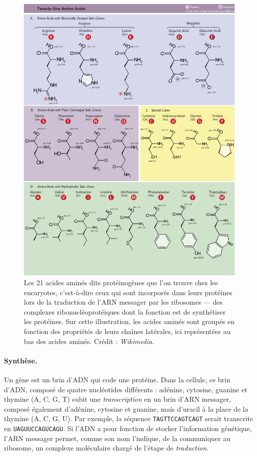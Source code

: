 	\begin{figure}[htb]
		\centering
		\includegraphics[width=\textwidth]{figures/ch1/aminoAcids}
		\caption[Ensemble des acides aminés]{Les 21 acides aminés dits protéinogènes que l'on trouve chez les eucaryotes, c'est-à-dire ceux qui sont incorporés dans leurs protéines lors de la traduction de l'ARN messager par les ribosomes --- des complexes ribonucléoprotéiques dont la fonction est de synthétiser les protéines. Sur cette illustration, les acides aminés sont groupés en fonction des propriétés de leurs chaînes latérales, ici représentées \og au bas \fg{} des acides aminés. Crédit : \emph{Wikimedia}.}
		\label{fig:aminoAcids}
	\end{figure}
	
	\paragraph{Synthèse.}
	Un gène est un brin d'ADN qui \og code \fg{}  une protéine. Dans la cellule, ce brin d'ADN, composé de quatre nucléotides différents : adénine, cytosine, guanine et thymine (A, C, G, T) subit une \emph{transcription} en un brin d'ARN messager, composé également d'adénine, cytosine et guanine, mais d'uracil à la place de la thymine (A, C, G, U). Par exemple, la séquence \texttt{TAGTTCCAGTCAGT} serait transcrite en \texttt{UAGUUCCAGUCAGU}. Si l'ADN a pour fonction de stocker l'information génétique, l'ARN messager permet, comme son nom l'indique, de la communiquer au ribosome, un complexe moléculaire chargé de l'étape de \emph{traduction}.
	
